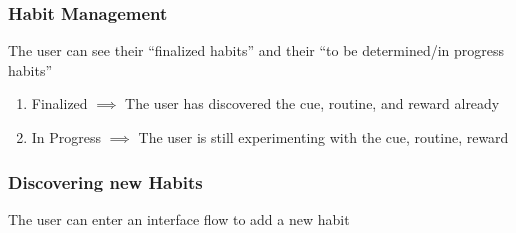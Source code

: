 \subsubsection{Habit Management}
The user can see their “finalized habits” and their “to be determined/in progress habits” 
\begin{enumerate}
    \item Finalized $\implies$ The user has discovered the cue, routine, and reward already
    \item In Progress $\implies$ The user is still experimenting with the cue, routine, reward
\end{enumerate}
\subsubsection{Discovering new Habits}    
The user can enter an interface flow to add a new habit
